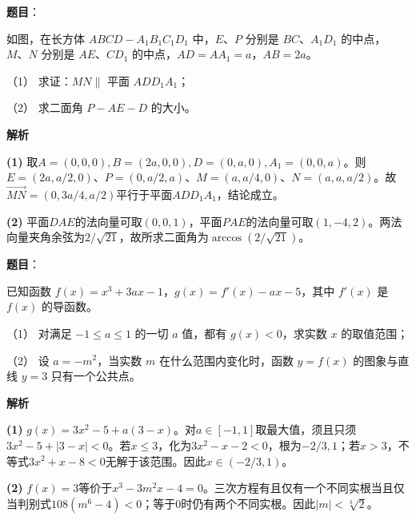 \begin{answer}

\textbf{题目}：

如图，在长方体 $ABCD-A_1B_1C_1D_1$ 中，$E\text{、}P$ 分别是 $BC\text{、}A_1D_1$ 的中点，$M\text{、}N$ 分别是 $AE\text{、}CD_1$ 的中点，$AD=AA_1=a$，$AB=2a$。

（1） 求证：$MN\parallel$ 平面 $ADD_1A_1$；

（2） 求二面角 $P-AE-D$ 的大小。
\nopagebreak[4]
\begin{center}\end{center}
\nopagebreak[4]
\textbf{解析}

\textbf{(1)} 取$A=(0,0,0),B=(2a,0,0),D=(0,a,0),A_1=(0,0,a)$。则$E=(2a,a/2,0)$、$P=(0,a/2,a)$、$M=(a,a/4,0)$、$N=(a,a,a/2)$。故$\overrightarrow{MN}=(0,3a/4,a/2)$平行于平面$ADD_1A_1$，结论成立。

\textbf{(2)} 平面$DAE$的法向量可取$(0,0,1)$，平面$PAE$的法向量可取$(1,-4,2)$。两法向量夹角余弦为$2/\sqrt{21}$，故所求二面角为$\arccos(2/\sqrt{21})$。



\end{answer}
\begin{answer}

\textbf{题目}：

已知函数 $f(x)=x^3+3ax-1$，$g(x)=f'(x)-ax-5$，其中 $f'(x)$ 是 $f(x)$ 的导函数。

（1） 对满足 $-1\leqslant a\leqslant1$ 的一切 $a$ 值，都有 $g(x)<0$，求实数 $x$ 的取值范围；

（2） 设 $a=-m^2$，当实数 $m$ 在什么范围内变化时，函数 $y=f(x)$ 的图象与直线 $y=3$ 只有一个公共点。

\textbf{解析}

\textbf{(1)} $g(x)=3x^2-5+a(3-x)$。对$a\in[-1,1]$取最大值，须且只须$3x^2-5+|3-x|<0$。若$x\le3$，化为$3x^2-x-2<0$，根为$-2/3,1$；若$x>3$，不等式$3x^2+x-8<0$无解于该范围。因此$x\in(-2/3,1)$。

\textbf{(2)} $f(x)=3$等价于$x^3-3m^2x-4=0$。三次方程有且仅有一个不同实根当且仅当判别式$108(m^6-4)<0$；等于0时仍有两个不同实根。因此$|m|<\sqrt[3]{2}$。



\end{answer}
